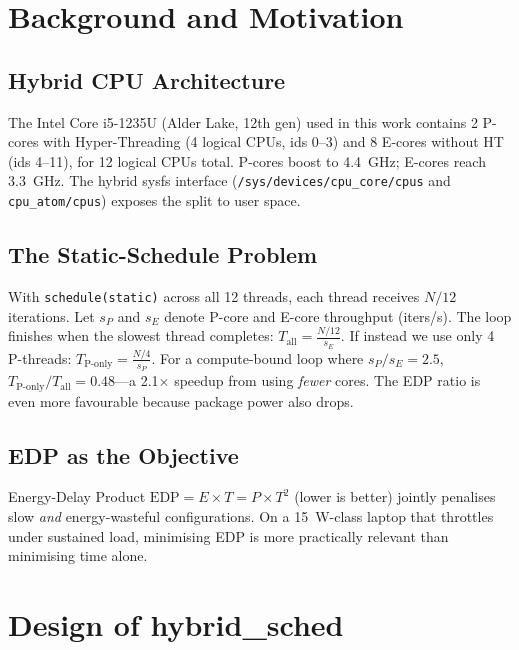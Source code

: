 \documentclass[conference]{IEEEtran}
\begin{document}
\section{Background and Motivation}

\subsection{Hybrid CPU Architecture}

The Intel Core i5-1235U (Alder Lake, 12th gen) used in this work
contains 2 P-cores with Hyper-Threading (4 logical CPUs, ids 0--3)
and 8 E-cores without HT (ids 4--11), for 12 logical CPUs total.
P-cores boost to 4.4~GHz; E-cores reach 3.3~GHz.
The hybrid sysfs interface (\texttt{/sys/devices/cpu\_core/cpus} and
\texttt{cpu\_atom/cpus}) exposes the split to user space.

\subsection{The Static-Schedule Problem}

With \texttt{schedule(static)} across all 12 threads, each thread
receives $N/12$ iterations.
Let $s_P$ and $s_E$ denote P-core and E-core throughput
(iters/s).
The loop finishes when the slowest thread completes:
$T_{\text{all}} = \frac{N/12}{s_E}$.
If instead we use only 4 P-threads:
$T_{\text{P-only}} = \frac{N/4}{s_P}$.
For a compute-bound loop where $s_P / s_E = 2.5$,
$T_{\text{P-only}} / T_{\text{all}} = 0.48$---a 2.1$\times$ speedup
from using \textit{fewer} cores.
The EDP ratio is even more favourable because package power also drops.

\subsection{EDP as the Objective}

Energy-Delay Product $\text{EDP} = E \times T = P \times T^2$
(lower is better) jointly penalises slow \textit{and} energy-wasteful
configurations.
On a 15~W-class laptop that throttles under sustained load,
minimising EDP is more practically relevant than minimising time alone.

\section{Design of hybrid\_sched}
\end{document}
